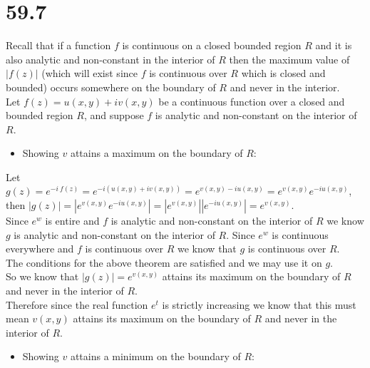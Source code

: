 \documentclass{article}
\begin{document}
\newpage
\section*{59.7}
\begin{center}
    \doublespacing
    Recall that if a function $f$ is continuous on a closed bounded region $R$ and it is also analytic and non-constant in the interior of $R$ then the maximum value of $|f(z)|$ (which will exist since $f$ is continuous over $R$ which is closed and bounded) occurs somewhere on the boundary of $R$ and never in the interior.
    \break
    \\Let $f(z) = u(x, y) + iv(x, y)$ be a continuous function over a closed and bounded region $R$, and suppose $f$ is analytic and non-constant on the interior of $R$.
\end{center}
\begin{itemize}
        \item Showing $v$ attains a maximum on the boundary of $R$:
\end{itemize}
\begin{center}
    \doublespacing
    Let $g(z) = e^{-i\:f(z)} = e^{-i(u(x, y) + iv(x, y))} = e^{v(x, y)-iu(x, y)} = e^{v(x, y)}e^{-iu(x, y)}$, then $|g(z)| = |e^{v(x, y)}e^{-iu(x, y)}| = |e^{v(x, y)}||e^{-iu(x, y)}| = e^{v(x, y)}$.
    \\Since $e^w$ is entire and $f$ is analytic and non-constant on the interior of $R$ we know $g$ is analytic and non-constant on the interior of $R$. Since $e^w$ is continuous everywhere and $f$ is continuous over $R$ we know that $g$ is continuous over $R$.
    \\The conditions for the above theorem are satisfied and we may use it on $g$.
    \break
    \\So we know that $|g(z)| = e^{v(x, y)}$ attains its maximum on the boundary of $R$ and never in the interior of $R$.
    \\Therefore since the real function $e^t$ is strictly increasing we know that this must mean $v(x, y)$ attains its maximum on the boundary of $R$ and never in the interior of $R$.
\end{center}
\begin{itemize}
        \item Showing $v$ attains a minimum on the boundary of $R$:
\end{itemize}
\end{document}
